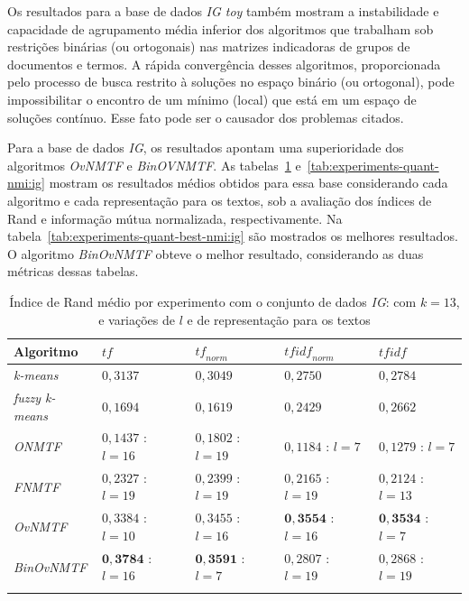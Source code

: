 \documentclass[
    12pt,                %
    oneside,            %
    a4paper,            %
    english,            %
    brazil                %
    ]{abntex2ppgsi}
\begin{document}
Os resultados para a base de dados \textit{IG toy} também mostram a instabilidade e capacidade de agrupamento média inferior dos algoritmos que trabalham sob restrições binárias (ou ortogonais) nas matrizes indicadoras de grupos de documentos e termos. A rápida convergência desses algoritmos, proporcionada pelo processo de busca restrito à soluções no espaço binário (ou ortogonal), pode impossibilitar o encontro de um mínimo (local) que está em um espaço de soluções contínuo. Esse fato pode ser o causador dos problemas citados.


Para a base de dados \textit{IG}, os resultados apontam uma superioridade dos algoritmos \textit{OvNMTF} e \textit{BinOVNMTF}.
As tabelas~\ref{tab:experiments-quant-rand:ig} e~\ref{tab:experiments-quant-nmi:ig} mostram os resultados médios obtidos para essa base considerando cada algoritmo e cada representação para os textos, sob a avaliação dos índices de Rand e informação mútua normalizada, respectivamente.
Na tabela~\ref{tab:experiments-quant-best-nmi:ig} são mostrados os melhores resultados.
O algoritmo \textit{BinOvNMTF} obteve o melhor resultado, considerando as duas métricas dessas tabelas.

\begin{table}[H]
\centering
    \caption{Índice de Rand médio por experimento com o conjunto de dados \textit{IG}: com $k = 13$, e variações de $l$ e de representação para os textos}
    \begin{tabular}{lllll}
        \hline
        \textbf{Algoritmo} & $\textit{tf}$ & $\textit{tf}_{norm}$ & $\textit{tfidf}_{norm}$ & $\textit{tfidf}$ \\
        \hline
        \textit{k-means}       & $0,3137$            & $0,3049$            & $0,2750$            & $0,2784$ \\
        \textit{fuzzy k-means} & $0,1694$            & $0,1619$            & $0,2429$            & $0,2662$ \\
        \textit{ONMTF}         & $0,1437$ : $l = 16$ & $0,1802$ : $l = 19$ & $0,1184$ : $l = 7$  & $0,1279$ : $l = 7$ \\
        \textit{FNMTF}         & $0,2327$ : $l = 19$ & $0,2399$ : $l = 19$ & $0,2165$ : $l = 19$ & $0,2124$ : $l = 13$ \\
        \textit{OvNMTF}        & $0,3384$ : $l = 10$ & $0,3455$ : $l = 16$ & $\mathbf{0,3554}$ : $l = 16$ & $\mathbf{0,3534}$ : $l = 7$ \\
        \textit{BinOvNMTF}     & $\mathbf{0,3784}$ : $l = 16$ & $\mathbf{0,3591}$ : $l = 7$ & $0,2807$ : $l = 19$ & $0,2868$ : $l = 19$ \\
        \hline \\
    \end{tabular}
    \label{tab:experiments-quant-rand:ig}
\end{table}
\end{document}
